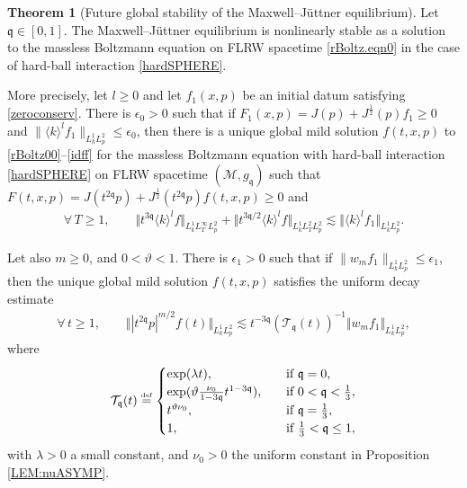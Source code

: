 \documentclass[reqno]{amsart}
\newcommand{\eqdef }{\overset{\mbox{\tiny{def}}}{=}}
\newcommand{\pv}{p}
\def\norm#1{\big\Vert#1\big\Vert}
\newcommand{\qq}{\mathfrak{q}}
\newcommand{\tTq}{t^{3\qq}}
\newcommand{\tc}{\vartheta}
\newcommand{\tw}{\mathcal{T}_{\qq}}
\theoremstyle{definition}
\newtheorem{theorem}{Theorem}
\numberwithin{equation}{section}
\numberwithin{theorem}{section}
\begin{document}
\begin{theorem}[Future global stability of the Maxwell--J\"uttner equilibrium]\label{Torus Existence}
Let \(\qq\in [0,1]\). The Maxwell--J\"uttner equilibrium is nonlinearly stable as a solution to the massless Boltzmann equation on FLRW spacetime \eqref{rBoltz.eqn0} in the case of hard-ball interaction \eqref{hardSPHERE}.



More precisely, let \(l\geq 0\) and let \(f_1(x,p)\) be an initial datum satisfying \eqref{zeroconserv}. There is \(\epsilon_0>0\) such that if \(F_1(x,p)=J(p)+J^{\frac{1}{2}}(p)f_1\geq 0\) and \(\|\langle k \rangle^lf_1\|_{L^{1}_{k}L^2_p}\leq \epsilon_0\), then there is a unique global mild solution \(f(t,x,p)\) to \eqref{rBoltz00}--\eqref{idff} for the massless Boltzmann equation with hard-ball interaction \eqref{hardSPHERE} on FLRW spacetime \((\mathcal{M},g_{\qq})\) such that \(F(t,x,p)=J(t^{2\qq}p)+J^{\frac{1}{2}}(t^{2\qq}p)f(t,x,p)\geq 0\) and 
\begin{align}
\forall \,T\geq 1,\qquad    {\Vert{\tTq \langle k \rangle^lf}\Vert_{L^1_kL^\infty_TL^2_{\pv}}}
+
{\norm{t^{3\qq/2}\langle k \rangle^l f}_{L^1_kL^2_TL^2_{\pv}}}
\lesssim 
\norm{ \langle k \rangle^l{f}_1}_{L^1_k L^2_{\pv}}.\label{globalestim}
\end{align}

Let also \(m\geq 0\), and $0< \tc < 1$. There is \(\epsilon_1>0\) such that if \(\|w_{m}f_1\|_{L^{1}_{k}L^2_p}\leq \epsilon_1\), then the unique global mild solution \(f(t,x,p)\) satisfies the uniform decay estimate 
\begin{align}
\forall \,t\geq 1,\qquad    {\Vert{ |t^{2\qq}p|^{m/2}f(t)}\Vert_{L^1_kL^2_{\pv}}}
\lesssim t^{-3\qq}(\tw(t))^{-1}\norm{ w_{m}{f}_1}_{L^1_k L^2_{\pv}},\label{decayestimate} 
\end{align}
where 
\begin{equation}\label{weight.decay}
    \tw(t)\eqdef
    \begin{cases}
    \exp(\lambda t),\quad &\text{if} \,\,\qq=0,\\
        \exp (\tc\frac{\nu_0}{1-3\qq}t^{1-3\qq}),\quad &\text{if} \,\,0<\qq<\frac{1}{3},\\
        t^{\tc\nu_0},\qquad &\text{if} \,\,\qq=\frac{1}{3},\\
        1,\qquad &\text{if} \,\,\frac{1}{3}<\qq\leq 1,\\
    \end{cases}
\end{equation}
with \(\lambda>0\) a small constant, and \(\nu_0>0\) the uniform constant in Proposition \ref{LEM:nuASYMP}.
\end{theorem}
\end{document}
